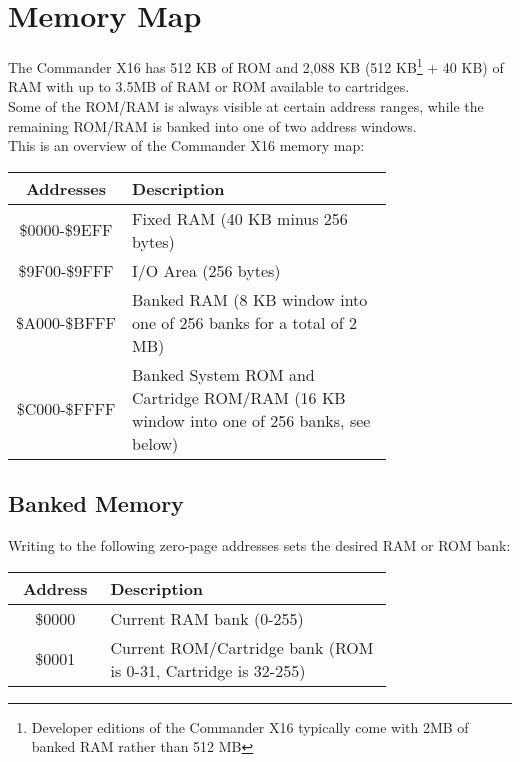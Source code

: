 \chapter*{Memory Map}

The Commander X16 has 512 KB of ROM and 2,088 KB (512 KB\footnote{Developer
editions of the Commander X16 typically come with 2MB of banked RAM rather than
512 MB} + 40 KB) of RAM with up to 3.5MB of RAM or ROM available to
cartridges.\\

Some of the ROM/RAM is always visible at certain address ranges, while the
remaining ROM/RAM is banked into one of two address windows.\\

This is an overview of the Commander X16 memory map:\\

\begin{tabular}{|c|p{0.75\linewidth}|}
	\hline
	{\bfseries Addresses} & {\bfseries Description}\\ \hline
	\$0000-\$9EFF & Fixed RAM (40 KB minus 256 bytes)\\ \hline
	\$9F00-\$9FFF & I/O Area (256 bytes)\\ \hline
	\$A000-\$BFFF & Banked RAM (8 KB window into one of 256 banks for a total of 2 MB)\\ \hline
	\$C000-\$FFFF & Banked System ROM and Cartridge ROM/RAM (16 KB window into one of 256 banks, see below)\\ \hline
\end{tabular}

\section{Banked Memory}

Writing to the following zero-page addresses sets the desired RAM or ROM bank:\\

\begin{tabular}{|c|p{0.75\linewidth}|}
	\hline
	{\bfseries Address} & {\bfseries Description}\\ \hline
	\$0000 & Current RAM bank (0-255)\\ \hline
	\$0001 & Current ROM/Cartridge bank (ROM is 0-31, Cartridge is 32-255)\\ \hline
\end{tabular}

\vspace{16pt}

